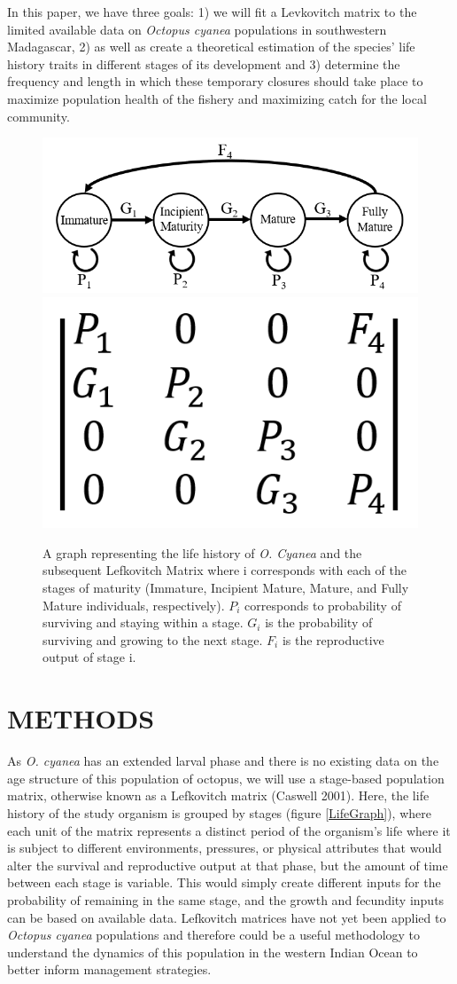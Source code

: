 \documentclass[
]{article}
\begin{document}
In this paper, we have three goals: 1) we will fit a Levkovitch matrix to the limited available data on \emph{Octopus cyanea} populations in southwestern Madagascar, 2) as well as create a theoretical estimation of the species' life history traits in different stages of its development and 3) determine the frequency and length in which these temporary closures should take place to maximize population health of the fishery and maximizing catch for the local community.



\begin{figure}
\includegraphics[width=0.45\linewidth]{LifeGraph} \includegraphics[width=0.45\linewidth]{MtxGeneric} \caption{A graph representing the life history of \emph{O. Cyanea} and the subsequent Lefkovitch Matrix where i corresponds with each of the stages of maturity (Immature, Incipient Mature, Mature, and Fully Mature individuals, respectively). \(P_i\) corresponds to probability of surviving and staying within a stage. \(G_i\) is the probability of surviving and growing to the next stage. \(F_i\) is the reproductive output of stage i. \label{LifeGraph}}\label{fig:LifeGraph}
\end{figure}

\hypertarget{methods}{%
\section{METHODS}\label{methods}}

As \emph{O. cyanea} has an extended larval phase and there is no existing data on the age structure of this population of octopus, we will use a stage-based population matrix, otherwise known as a Lefkovitch matrix (Caswell 2001). Here, the life history of the study organism is grouped by stages (figure \ref{LifeGraph}), where each unit of the matrix represents a distinct period of the organism's life where it is subject to different environments, pressures, or physical attributes that would alter the survival and reproductive output at that phase, but the amount of time between each stage is variable. This would simply create different inputs for the probability of remaining in the same stage, and the growth and fecundity inputs can be based on available data. Lefkovitch matrices have not yet been applied to \emph{Octopus cyanea} populations and therefore could be a useful methodology to understand the dynamics of this population in the western Indian Ocean to better inform management strategies.
\end{document}
